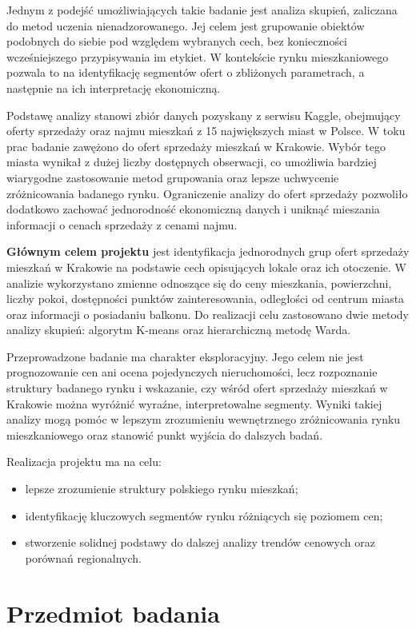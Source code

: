 \documentclass{report}
\begin{document}
Jednym z podejść umożliwiających takie badanie jest analiza skupień, zaliczana do metod uczenia nienadzorowanego. 
Jej celem jest grupowanie obiektów podobnych do siebie pod względem wybranych cech, bez konieczności wcześniejszego przypisywania im etykiet. 
W kontekście rynku mieszkaniowego pozwala to na identyfikację segmentów ofert o zbliżonych parametrach, a następnie na ich interpretację ekonomiczną.

Podstawę analizy stanowi zbiór danych pozyskany z serwisu Kaggle, obejmujący oferty sprzedaży oraz najmu mieszkań z 15 największych miast w Polsce.
W toku prac badanie zawężono do ofert sprzedaży mieszkań w Krakowie. 
Wybór tego miasta wynikał z dużej liczby dostępnych obserwacji, co umożliwia bardziej wiarygodne zastosowanie metod grupowania oraz lepsze uchwycenie zróżnicowania badanego rynku. 
Ograniczenie analizy do ofert sprzedaży pozwoliło dodatkowo zachować jednorodność ekonomiczną danych i uniknąć mieszania informacji o cenach sprzedaży z cenami najmu.

\textbf{Głównym celem projektu} jest identyfikacja jednorodnych grup ofert sprzedaży mieszkań w Krakowie na podstawie cech opisujących lokale oraz ich otoczenie. 
W analizie wykorzystano zmienne odnoszące się do ceny mieszkania, powierzchni, liczby pokoi, dostępności punktów zainteresowania, odległości od centrum miasta oraz informacji o posiadaniu balkonu. 
Do realizacji celu zastosowano dwie metody analizy skupień: algorytm K-means oraz hierarchiczną metodę Warda.

Przeprowadzone badanie ma charakter eksploracyjny. 
Jego celem nie jest prognozowanie cen ani ocena pojedynczych nieruchomości, lecz rozpoznanie struktury badanego rynku i wskazanie, czy wśród ofert sprzedaży mieszkań w Krakowie można wyróżnić wyraźne, interpretowalne segmenty. 
Wyniki takiej analizy mogą pomóc w lepszym zrozumieniu wewnętrznego zróżnicowania rynku mieszkaniowego oraz stanowić punkt wyjścia do dalszych badań.

Realizacja projektu ma na celu:
\begin{itemize}
    \item lepsze zrozumienie struktury polskiego rynku mieszkań;
    \item identyfikację kluczowych segmentów rynku różniących się poziomem cen;
    \item stworzenie solidnej podstawy do dalszej analizy trendów cenowych oraz porównań regionalnych.
\end{itemize}

\chapter{Przedmiot badania}
\end{document}
